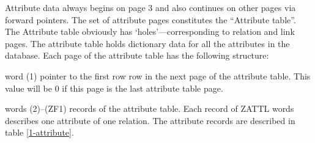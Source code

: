 \documentclass[11pt,a4paper]{report}
\begin{document}
Attribute data always begins on page 3 and also continues on
other pages via forward pointers.  The set of
attribute pages constitutes the ``Attribute table''.
The Attribute table obviously has `holes'---corresponding
to relation and link pages.
The attribute table holds dictionary data for all  the attributes  in
the  database.   Each page of the attribute table has the
following structure:
 
\begin{List}
\item[word (1)] pointer to the first row
                row in the next page of the
                attribute table. This value
                will be 0 if this page is the
                last attribute table page.
\item[words (2)--(ZF1)] records of the attribute table.
                Each record of ZATTL words describes one attribute
                of one relation.
                The attribute records are described in table
                \ref{1-attribute}.
\end{List}
 
\end{document}
